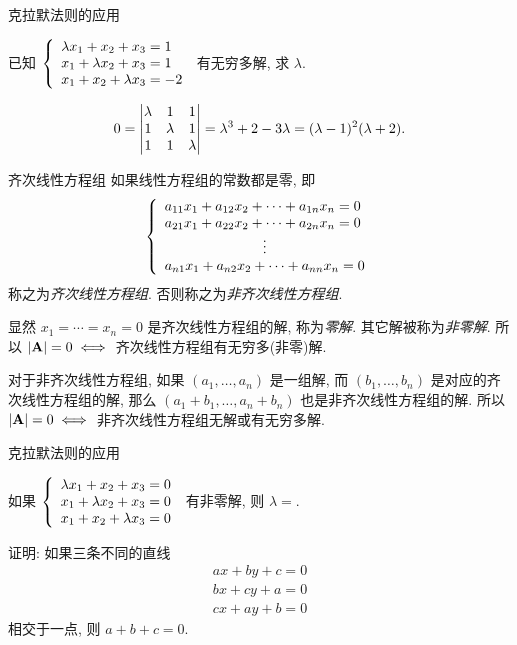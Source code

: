 \begin{frame}{克拉默法则的应用}
	\onslide<+->
	\begin{example}
		已知 $\left\{\begin{array}{l}
			\lambda x_1+x_2+x_3=1\\
			x_1+\lambda x_2+x_3=1\\
			x_1+x_2+\lambda x_3=-2\end{array}\right.$
		有无穷多解, 求 $\lambda$.
	\end{example}
	\onslide<+->
	\begin{solution}
		\[0=\left|\begin{matrix}\lambda&1&1\\1&\lambda&1\\1&1&\lambda\end{matrix}\right|
		=\lambda^3+2-3\lambda=(\lambda-1)^2(\lambda+2).\]
		\onslide<+->{%
			因此 $\lambda=-2$.
		}
	\end{solution}
\end{frame}


\begin{frame}{齐次线性方程组}
	\onslide<+->
	如果线性方程组的常数都是零, 即
	\[\laeq{
		a_{11}x_1+a_{12}x_2+\cdots+a_{1n}x_n=0\\
		a_{21}x_1+a_{22}x_2+\cdots+a_{2n}x_n=0\\
		\vvdots\\
		a_{n1}x_1+a_{n2}x_2+\cdots+a_{nn}x_n=0
	}\]
	称之为\emph{齐次线性方程组}.
	\onslide<+->
	否则称之为\emph{非齐次线性方程组}.

	\onslide<+->
	显然 $x_1=\cdots=x_n=0$ 是齐次线性方程组的解, 称为\emph{零解}. 其它解被称为\emph{非零解}.
	\onslide<+->
	所以 \alert{$|{\mathbf{A}}|=0\iff$ 齐次线性方程组有无穷多(非零)解}.
	
	\onslide<+->
	对于非齐次线性方程组, 如果 $(a_1,\dots,a_n)$ 是一组解, 而 $(b_1,\dots,b_n)$ 是对应的齐次线性方程组的解, 那么
	$(a_1+b_1,\dots,a_n+b_n)$ 也是非齐次线性方程组的解.
	\onslide<+->
	所以 \alert{$|{\mathbf{A}}|=0\iff$ 非齐次线性方程组无解或有无穷多解}.
\end{frame}


\begin{frame}{克拉默法则的应用}
	\onslide<+->
	\begin{exercise}
		如果 $\left\{\begin{array}{l}
			\lambda x_1+x_2+x_3=0\\
			x_1+\lambda x_2+x_3=0\\
			x_1+x_2+\lambda x_3=0\end{array}\right.$
		有非零解, 则 $\lambda=$.
	\end{exercise}
	\onslide<+->
	\begin{example}
		证明: 如果三条不同的直线
		\begin{align*}
			ax+by+c=0\\
			bx+cy+a=0\\
			cx+ay+b=0
		\end{align*}
		相交于一点, 则 $a+b+c=0$.
	\end{example}
\end{frame}



